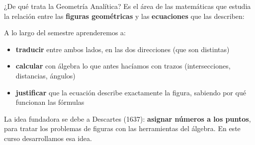 \documentclass[aspectratio=169,10pt]{beamer}
\newcommand{\destaca}[1]{%
  \par\vspace{3pt}\noindent
  \colorbox{turquesaClaro}{%
    \parbox{\dimexpr\linewidth-2\fboxsep\relax}{\vspace{3pt}#1\vspace{3pt}}}%
  \par\vspace{3pt}}
\begin{document}
\begin{frame}{¿De qué trata la Geometría Analítica?}
  Es el área de las matemáticas que estudia la relación entre las
  \textbf{figuras geométricas} y las \textbf{ecuaciones} que las
  describen:

  \vspace{0.2cm}
  \begin{center}
  \end{center}
  
  \vspace{0.2cm}
  A lo largo del semestre aprenderemos a:

  \begin{itemize}
    \item \textbf{traducir} entre ambos lados, en las dos direcciones
      (que son distintas)
    \item \textbf{calcular} con álgebra lo que antes hacíamos con trazos
      (intersecciones, distancias, ángulos)
    \item \textbf{justificar} que la ecuación describe exactamente la
      figura, sabiendo por qué funcionan las fórmulas
  \end{itemize}

  \vspace{0.1cm}
  \destaca{La idea fundadora se debe a Descartes (1637):
  \textbf{asignar números a los puntos}, para tratar los problemas de
  figuras con las herramientas del álgebra. En este curso desarrollamos
  esa idea.}
\end{frame}
\end{document}
